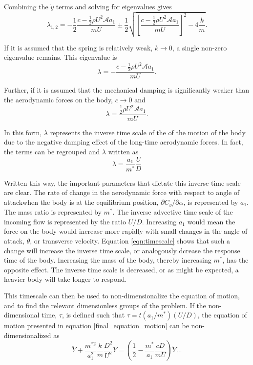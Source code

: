 Combining the $\dot{y}$ terms and solving for eigenvalues gives
\begin{equation}
  \label{eqn:eigs}
  \lambda_{1,2}= -\frac{1}{2}\frac{c-\frac{1}{2}\rho U^2\mathcal{A}a_1}{mU}\pm\frac{1}{2}\sqrt{\left[\frac{c-\frac{1}{2}\rho U^2\mathcal{A}a_1}{mU}\right]^2-4\frac{k}{m}}.
\end{equation}

If it is assumed that the spring is relatively weak, $k\rightarrow 0$, a single non-zero eigenvalue remains. This eigenvalue is
\begin{equation}
  \label{eqn:eigs_nospring}
  \lambda=-\frac{c-\frac{1}{2}\rho U^2\mathcal{A}a_1}{mU}.
\end{equation}

Further, if it is assumed that the mechanical damping is significantly weaker than the aerodynamic forces on the body, $c\rightarrow 0$ and
\begin{equation}
  \label{eqn:eigs_nospring_nodamp}
  \lambda=\frac{\frac{1}{2}\rho U^2\mathcal{A}a_1}{mU}.
\end{equation}

In this form, $\lambda$ represents the inverse time scale of the of the motion of the body due to the negative damping effect of the long-time aerodynamic forces. In fact, the terms can be regrouped and $\lambda$ written as
\begin{equation}
  \label{eqn:timescale}
  \lambda = \frac{a_1}{m^*}\frac{U}{D}
\end{equation}

Written this way, the important parameters that dictate this inverse time scale are clear. The rate of change in the aerodynamic force with respect to angle of attackwhen the body is at the equilibrium position, $\partial C_y/\partial \alpha$, is represented by $a_1$. The mass ratio is represented by $m^*$. The inverse advective time scale of the incoming flow is represented by the ratio $U/D$. Increasing $a_1$ would mean the force on the body would increase more rapidly with small changes in the angle of attack, $\theta$, or transverse velocity. Equation \ref{eqn:timescale} shows that such a change will increase the inverse time scale, or analogously dcrease the response time of the body. Increasing the mass of the body, thereby increasing $m^*$, has the opposite effect. The inverse time scale is decreased, or as might be expected, a heavier body will take longer to respond.

This timescale can then be used to non-dimensionalize the equation of motion, and to find the relevant dimensionless groups of the problem. If the non-dimensional time, $\tau$, is defined such that $\tau=t(a_1/m^*)(U/D)$, the equation of motion presented in equation \ref{final_equation_motion} can be non-dimensionalized as
\begin{equation}
  \label{eqn:eom_nondim}
  \ddot{Y} + \frac{m^{*2}}{a_1^2}\frac{k}{m}\frac{D^2}{U^2}Y = \left(\frac{1}{2} - \frac{m^*}{a_1}\frac{cD}{mU}\right)\dot{Y} \dots
\end{equation}

